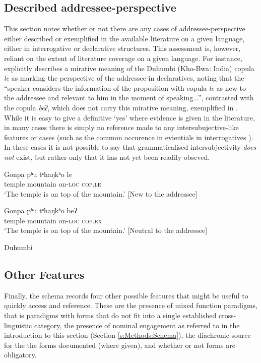 \subsection{Described addressee-perspective}
This section notes whether or not there are any cases of addressee-perspective either described or exemplified in the available literature on a given language, either in interrogative or declarative structures. This assessment is, however, reliant on the extent of literature coverage on a given language. For instance,  explicitly describes a mirative meaning of the Duhumbi (Kho-Bwa: India) copula \textit{le} as marking the perspective of the addressee in declaratives, noting that the ``speaker considers the information of the proposition with copula \textit{le} as new to the addressee and relevant to him in the moment of speaking...'', contrasted with the copula \textit{beʔ}, which does not carry this mirative meaning, exemplified in . While it is easy to give a definitive `yes' where evidence is given in the literature, in many cases there is simply no reference made to any intersubujective-like features or cases (such as the common occurence in evientials in interrogatives \cite{Aikhenvald2018Intro}). In these cases it is not possible to say that grammaticalised intersubjectivity \textit{does not} exist, but rather only that it has not yet been readily obseved.

\begin{exe}
\ex 
\begin{xlist}
\ex 
\gll Gonpa pʰu tᶝhaŋkʰo le \\
temple mountain on-\textsc{loc} \textsc{cop.le} \\
\glt `The temple is on top of the mountain.' [New to the addressee]

\ex 
\gll Gonpa pʰu tᶝhaŋkʰo beʔ \\
temple mountain on-\textsc{loc} \textsc{cop.ex} \\
\glt `The temple is on top of the mountain.' [Neutral to the addressee]
\end{xlist}
Duhumbi \cite[Kho-Bwa: India][408, notes on relation to addressee added by me]{Bodt2020}
\end{exe}

\subsection{Other Features}
Finally, the schema records four other possible features that might be useful to quickly access and reference. These are the presence of mixed function paradigms, that is paradigms with forms that do not fit into a single established cross-linguistic category, the presence of nominal engagement as referred to in the introduction to this section (Section \ref{s:Methods:Schema}), the diachronic source for the the forms documented (where given), and whether or not forms are obligatory.

